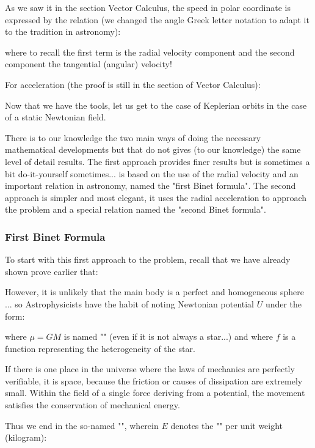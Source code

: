 	As we saw it in the section Vector Calculus, the speed in polar coordinate is expressed by the relation (we changed the angle Greek letter notation to adapt it to the tradition in astronomy):
	
	where to recall the first term is the radial velocity component and the second component the tangential (angular) velocity!

	For acceleration (the proof is still in the section of Vector Calculus):
	
	Now that we have the tools, let us get to the case of Keplerian orbits in the case of a static Newtonian field.

	There is to our knowledge the two main ways of doing the necessary mathematical developments but that do not gives (to our knowledge) the same level of detail results. The first approach provides finer results but is sometimes a bit do-it-yourself sometimes... is based on the use of the radial velocity and an important relation in astronomy, named the "first Binet formula". The second approach is simpler and most elegant, it uses the radial acceleration to approach the problem and a special relation named the "second Binet formula".
	
	\subsubsection{First Binet Formula}
	To start with this first approach to the problem, recall that we have already shown prove earlier that:
	
	However, it is unlikely that the main body is a perfect and homogeneous sphere ... so Astrophysicists have the habit of noting Newtonian potential $U$ under the form:
	
	where $\mu=GM$ is named "" (even if it is not always a star...) and where $f$ is a function representing the heterogeneity of the star.
	
	If there is one place in the universe where the laws of mechanics are perfectly verifiable, it is space, because the friction or causes of dissipation are extremely small. Within the field of a single force deriving from a potential, the movement satisfies the conservation of mechanical energy.

	Thus we end in the so-named "", wherein $E$ denotes the "" per unit weight (kilogram):
	
